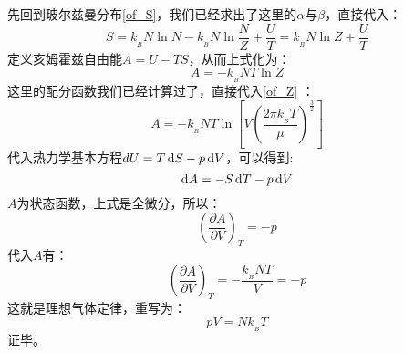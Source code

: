         \begin{prove}
            先回到玻尔兹曼分布\ref{of_S}，我们已经求出了这里的$\alpha$与$\beta$，直接代入：
            \begin{equation}
                S = k_{_B}N\ln N - k_{_B}N\ln\frac{N}{Z} + \frac{U}{T} = k_{_B}N\ln Z + \frac{U}{T}
            \end{equation}
            定义亥姆霍兹自由能$A=U-TS$，从而上式化为：
            \begin{equation}
                A = -k_{_B}NT\ln Z
            \end{equation}
            这里的配分函数我们已经计算过了，直接代入\ref{of_Z}
            ：
            \begin{equation}
                A = -k_{_B}NT\ln\left[V\left(\frac{2\pi k_{_B}T}{\mu}\right)^{\frac{3}{2}}\right]
                \label{of_A}
            \end{equation}
            代入热力学基本方程$dU=T\dif{S}-p\dif{V}$，可以得到:
            \begin{equation}
                \dif{A} = -S\dif{T} - p\dif{V}
                \label{of_dif_A}
            \end{equation}
            $A$为状态函数，上式是全微分，所以：
            \begin{equation}
                \left(\frac{\partial A}{\partial V}\right)_{T} = -p
            \end{equation}
            代入$A$有：
            \begin{equation}
                \left(\frac{\partial A}{\partial V}\right)_{T} = -\frac{k_{_B}NT}{V} =-p
            \end{equation}
            这就是理想气体定律，重写为：
            \begin{equation}
                pV = Nk_{_B}T
            \end{equation}
            证毕。
        \end{prove}
